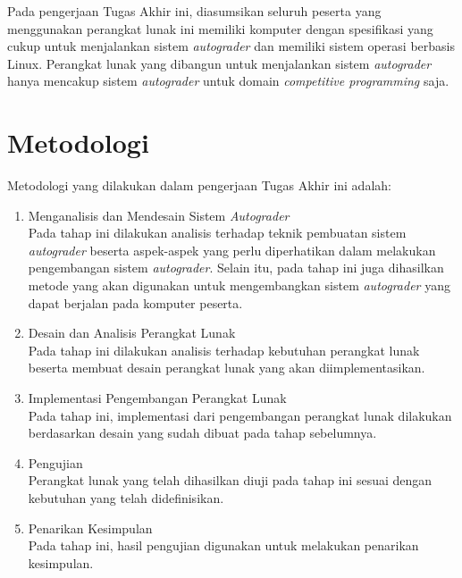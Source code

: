 \par Pada pengerjaan Tugas Akhir ini, diasumsikan seluruh peserta yang menggunakan perangkat lunak ini memiliki komputer dengan spesifikasi yang cukup untuk menjalankan sistem \textit{autograder} dan memiliki sistem operasi berbasis Linux. Perangkat lunak yang dibangun untuk menjalankan sistem \textit{autograder} hanya mencakup sistem \textit{autograder} untuk domain \textit{competitive programming} saja.

\section{Metodologi}

\par Metodologi yang dilakukan dalam pengerjaan Tugas Akhir ini adalah:
\begin{enumerate}

	\item Menganalisis dan Mendesain Sistem \textit{Autograder} \\ Pada tahap ini dilakukan analisis terhadap teknik pembuatan sistem \textit{autograder} beserta aspek-aspek yang perlu diperhatikan dalam melakukan pengembangan sistem \textit{autograder}. Selain itu, pada tahap ini juga dihasilkan metode yang akan digunakan untuk mengembangkan sistem \textit{autograder} yang dapat berjalan pada komputer peserta.
	
	\item Desain dan Analisis Perangkat Lunak \\ Pada tahap ini dilakukan analisis terhadap kebutuhan perangkat lunak beserta membuat desain perangkat lunak yang akan diimplementasikan.
	
	\item Implementasi Pengembangan Perangkat Lunak \\ Pada tahap ini, implementasi dari pengembangan perangkat lunak dilakukan berdasarkan desain yang sudah dibuat pada tahap sebelumnya.
	
	\item Pengujian \\ Perangkat lunak yang telah dihasilkan diuji pada tahap ini sesuai dengan kebutuhan yang telah didefinisikan.
	
	\item Penarikan Kesimpulan \\ Pada tahap ini, hasil pengujian digunakan untuk melakukan penarikan kesimpulan.

\end{enumerate}

